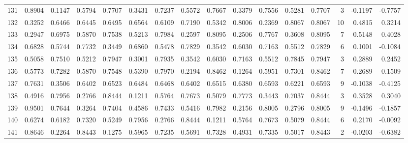 \begin{tabular}{lrrrrrrrrrrrrrrr}
131 &      0.8904 &  0.1147 &  0.5794 &  0.7707 &  0.3431 &  0.7237 &  0.5572 &  0.7667 &  0.3379 &  0.7556 &   0.5281 &     0.7707 &      3 &                   -0.1197 &                    -0.7757 \\
132 &      0.3252 &  0.6466 &  0.6445 &  0.6495 &  0.6564 &  0.6109 &  0.7190 &  0.5342 &  0.8006 &  0.2369 &   0.8067 &     0.8067 &     10 &                    0.4815 &                     0.3214 \\
133 &      0.2947 &  0.6975 &  0.5870 &  0.7538 &  0.5213 &  0.7984 &  0.2597 &  0.8095 &  0.2506 &  0.7767 &   0.3608 &     0.8095 &      7 &                    0.5148 &                     0.4028 \\
134 &      0.6828 &  0.5744 &  0.7732 &  0.3449 &  0.6860 &  0.5478 &  0.7829 &  0.3542 &  0.6030 &  0.7163 &   0.5512 &     0.7829 &      6 &                    0.1001 &                    -0.1084 \\
135 &      0.5058 &  0.7510 &  0.5212 &  0.7947 &  0.3001 &  0.7935 &  0.3542 &  0.6030 &  0.7163 &  0.5512 &   0.7845 &     0.7947 &      3 &                    0.2889 &                     0.2452 \\
136 &      0.5773 &  0.7282 &  0.5870 &  0.7548 &  0.5390 &  0.7970 &  0.2194 &  0.8462 &  0.1264 &  0.5951 &   0.7301 &     0.8462 &      7 &                    0.2689 &                     0.1509 \\
137 &      0.7631 &  0.3506 &  0.6402 &  0.6523 &  0.6484 &  0.6468 &  0.6402 &  0.6515 &  0.6380 &  0.6593 &   0.6221 &     0.6593 &      9 &                   -0.1038 &                    -0.4125 \\
138 &      0.4916 &  0.7956 &  0.2766 &  0.8444 &  0.1211 &  0.5764 &  0.7673 &  0.5079 &  0.7773 &  0.3443 &   0.7037 &     0.8444 &      3 &                    0.3528 &                     0.3040 \\
139 &      0.9501 &  0.7644 &  0.3264 &  0.7404 &  0.4586 &  0.7433 &  0.5416 &  0.7982 &  0.2156 &  0.8005 &   0.2796 &     0.8005 &      9 &                   -0.1496 &                    -0.1857 \\
140 &      0.6274 &  0.6182 &  0.7320 &  0.5249 &  0.7956 &  0.2766 &  0.8444 &  0.1211 &  0.5764 &  0.7673 &   0.5079 &     0.8444 &      6 &                    0.2170 &                    -0.0092 \\
141 &      0.8646 &  0.2264 &  0.8443 &  0.1275 &  0.5965 &  0.7235 &  0.5691 &  0.7328 &  0.4931 &  0.7335 &   0.5017 &     0.8443 &      2 &                   -0.0203 &                    -0.6382 \\

\end{tabular}
